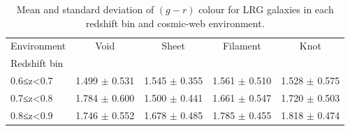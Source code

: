 \begin{table}
\caption{Mean and standard deviation of $(g-r)$ colour for LRG galaxies in each redshift bin and cosmic-web environment.}
\label{tab:lrg_colour_mean_std}
\begin{tabular}{lcccc}
\toprule
Environment & Void & Sheet & Filament & Knot \\
Redshift bin &  &  &  &  \\
\midrule
0.6≤z<0.7 & 1.499 $\pm$ 0.531 & 1.545 $\pm$ 0.355 & 1.561 $\pm$ 0.510 & 1.528 $\pm$ 0.575 \\
0.7≤z<0.8 & 1.784 $\pm$ 0.600 & 1.500 $\pm$ 0.441 & 1.661 $\pm$ 0.547 & 1.720 $\pm$ 0.503 \\
0.8≤z<0.9 & 1.746 $\pm$ 0.552 & 1.678 $\pm$ 0.485 & 1.785 $\pm$ 0.455 & 1.818 $\pm$ 0.474 \\
\bottomrule
\end{tabular}
\end{table}
